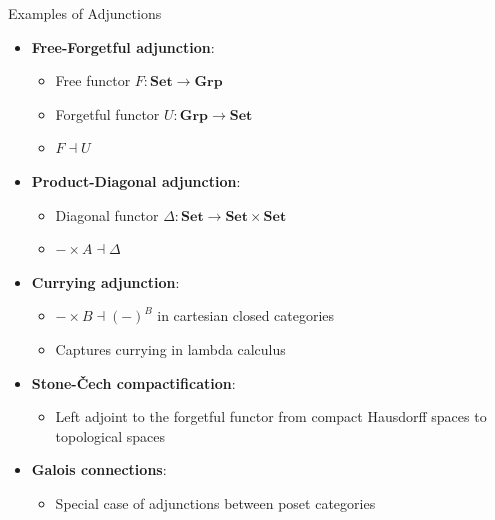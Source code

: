 \documentclass{beamer}
\begin{document}
\begin{frame}{Examples of Adjunctions}
    \begin{itemize}
        \item \textbf{Free-Forgetful adjunction}:
            \begin{itemize}
                \item Free functor $F: \textbf{Set} \to \textbf{Grp}$ 
                \item Forgetful functor $U: \textbf{Grp} \to \textbf{Set}$
                \item $F \dashv U$
            \end{itemize}
        \item \textbf{Product-Diagonal adjunction}:
            \begin{itemize}
                \item Diagonal functor $\Delta: \textbf{Set} \to \textbf{Set} \times \textbf{Set}$
                \item $- \times A \dashv \Delta$
            \end{itemize}
        \item \textbf{Currying adjunction}:
            \begin{itemize}
                \item $-\times B \dashv (-)^B$ in cartesian closed categories
                \item Captures currying in lambda calculus
            \end{itemize}
        \item \textbf{Stone-Čech compactification}:
            \begin{itemize}
                \item Left adjoint to the forgetful functor from compact Hausdorff spaces to topological spaces
            \end{itemize}
        \item \textbf{Galois connections}:
            \begin{itemize}
                \item Special case of adjunctions between poset categories
            \end{itemize}
    \end{itemize}
    \end{frame}
    
\end{document}
